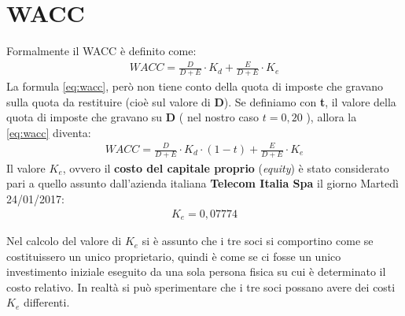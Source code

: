 \section[WACC]{WACC}
	Formalmente il \ac{WACC} è definito come:	
	\begin{equation}
	\label{eq:wacc}
	\begin{split}
		WACC = \frac{D}{D+E} \cdot K_d + \frac{E}{D+E} \cdot K_e 
	\end{split}
	\end{equation}
	La formula \ref{eq:wacc}, però non tiene conto della quota di imposte che gravano sulla quota da restituire (cioè sul valore di \textbf{D}). \newline 
	Se definiamo con \textbf{t}, il valore della quota di imposte che gravano su \textbf{D} ( nel nostro caso $ t = 0,20 $ ), allora la \ref{eq:wacc} diventa:
	\begin{equation}
	\label{eq:wacc_tax}
	\begin{split}
		WACC = \frac{D}{D+E} \cdot K_d \cdot ( 1 - t ) + \frac{E}{D+E} \cdot K_e 
	\end{split}
	\end{equation}
	Il valore $K_e$, ovvero il \textbf{costo del capitale proprio} (\textit{equity}) è stato considerato pari a  quello assunto dall'azienda italiana \textbf{Telecom Italia Spa} il giorno Martedì 24/01/2017\cite{wacc_ke}:
	\begin{equation}
	\label{eq:ke_telecom}
	\begin{split}
		K_e = 0,07774
	\end{split}
	\end{equation} 
		
	\begin{tcolorbox}[colframe=blue!75!black,adjusted title=\textbf{Osservazione!}]
		Nel calcolo del valore di $K_e$ si è assunto che i tre soci si comportino come se costituissero un unico proprietario, quindi è come se ci fosse un unico investimento iniziale eseguito da una sola persona fisica su cui è determinato il costo relativo. In realtà si può sperimentare che i tre soci possano avere dei costi $K_e$ differenti.
	\end{tcolorbox}	
	
